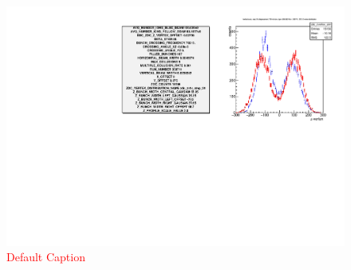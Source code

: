 \begin{figure}
\begin{center}
\includegraphics[width=\linewidth,height=\textheight,keepaspectratio]{./figures/359711_step24_config_compare}
\caption{ \textcolor{red}{Default Caption} }
\label{fig:359711_step24_config_compare}
\end{center}
\end{figure}

